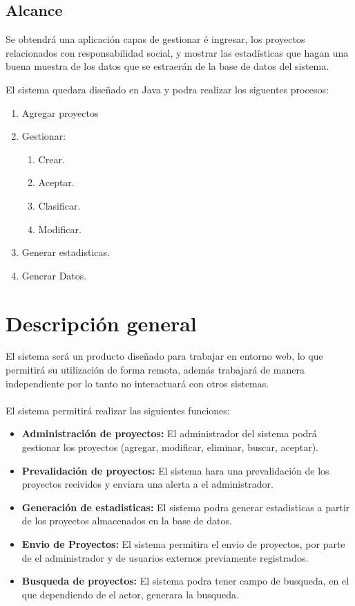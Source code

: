 \documentclass[journal]{IEEEtran}
\begin{document}
\subsection{Alcance}
Se obtendr\'a una aplicaci\'on capas de gestionar \'e ingresar,
los proyectos relacionados con responsabilidad social, y mostrar las estad\'isticas que hagan una buena
muestra de los datos que se estraer\'an de la base de datos del sistema.

El sistema quedara dise\~nado en Java y podra realizar los siguentes procesos:

\begin{enumerate}
\item Agregar proyectos
\item Gestionar:
\begin{enumerate}
\item Crear.
\item Aceptar.
\item Clasificar.
\item Modificar.
\end{enumerate}
\item Generar estadisticas.
\item Generar Datos.
\end{enumerate}

\section{\textbf{Descripci\'on general}}

El sistema será un producto diseñado para trabajar en entorno web, lo que permitirá su utilización de forma remota, además trabajará de manera independiente por lo tanto no interactuará con otros sistemas.\\\\
El sistema permitir\'a realizar las siguientes funciones:\\
\begin{itemize}
\item
\textbf{Administraci\'on de proyectos:} El administrador del sistema podr\'a gestionar los proyectos (agregar, modificar, eliminar, buscar, aceptar).
\item
\textbf{Prevalidaci\'on de proyectos:} El sistema hara una prevalidaci\'on de los proyectos recividos y enviara una alerta a el administrador.
\item
\textbf{Generaci\'on de estadisticas:} El sistema podra generar estadisticas a partir de los proyectos almacenados en la base de datos.
\item
\textbf{Envio de Proyectos:} El sistema permitira el envio de proyectos, por parte de el administrador y de usuarios externos previamente registrados.
\item
\textbf{Busqueda de proyectos:} El sistema podra tener campo de busqueda, en el que dependiendo de el actor, generara la busqueda.

\end{itemize}
\end{document}
